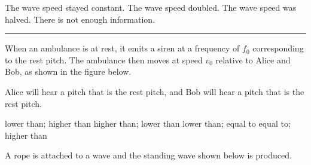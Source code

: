 \documentclass[answers]{exam}
\begin{document}
\begin{questions}
\begin{randomizechoices}[norandomize]
    \correctchoice The wave speed stayed constant.
    \choice The wave speed doubled.
    \choice The wave speed was halved.
    \choice There is not enough information. 
\end{randomizechoices}


\bigskip

\hrule

\question
When an ambulance is at rest, it emits a siren at a frequency of $f_0$ corresponding to the rest pitch. The ambulance then moves at speed $v_0$ relative to Alice and Bob, as shown in the figure below. 

\begin{center}
\end{center}

Alice will hear a pitch that is  the rest pitch, and Bob will hear a pitch that is  the rest pitch.

\begin{randomizechoices}
    \correctchoice lower than; \hspace{1pt} higher than
    \choice higher than; \hspace{1pt} lower than
    \choice lower than; \hspace{1pt} equal to
    \choice equal to; \hspace{1pt} higher than
\end{randomizechoices}

\ifprintanswers \else \clearpage \fi


\question
A rope is attached to a wave and the standing wave shown below is produced.

\begin{center}
\end{center}


\end{questions}
\end{document}
